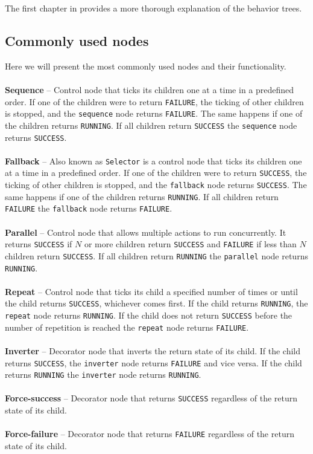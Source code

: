     \noindent The first chapter in \cite{BT_intro} provides a more thorough explanation of the behavior trees.

    \subsection{Commonly used nodes}
        Here we will present the most commonly used nodes and their functionality.\\\\
        \textbf{Sequence} -- Control node that ticks its children one at a time in a predefined order. If one of the children were to return \texttt{FAILURE}, the ticking of other children is stopped, and the \texttt{sequence} node returns \texttt{FAILURE}. The same happens if one of the children returns \texttt{RUNNING}. If all children return \texttt{SUCCESS} the \texttt{sequence} node returns \texttt{SUCCESS}.\\\\
        \textbf{Fallback} -- Also known as \texttt{Selector} is a control node that ticks its children one at a time in a predefined order. If one of the children were to return \texttt{SUCCESS}, the ticking of other children is stopped, and the \texttt{fallback} node returns \texttt{SUCCESS}. The same happens if one of the children returns \texttt{RUNNING}. If all children return \texttt{FAILURE} the \texttt{fallback} node returns \texttt{FAILURE}.\\\\
        \textbf{Parallel} -- Control node that allows multiple actions to run concurrently. It returns \texttt{SUCCESS} if $N$ or more children return \texttt{SUCCESS} and \texttt{FAILURE} if less than $N$ children return \texttt{SUCCESS}. If all children return \texttt{RUNNING} the \texttt{parallel} node returns \texttt{RUNNING}.\\\\
        \textbf{Repeat} -- Control node that ticks its child a specified number of times or until the child returns \texttt{SUCCESS}, whichever comes first. If the child returns \texttt{RUNNING}, the \texttt{repeat} node returns \texttt{RUNNING}. If the child does not return \texttt{SUCCESS} before the number of repetition is reached the \texttt{repeat} node returns \texttt{FAILURE}.\\\\
        \textbf{Inverter} -- Decorator node that inverts the return state of its child. If the child returns \texttt{SUCCESS}, the \texttt{inverter} node returns \texttt{FAILURE} and vice versa. If the child returns \texttt{RUNNING} the \texttt{inverter} node returns \texttt{RUNNING}.\\\\
        \textbf{Force-success} -- Decorator node that returns \texttt{SUCCESS} regardless of the return state of its child.\\\\
        \textbf{Force-failure} -- Decorator node that returns \texttt{FAILURE} regardless of the return state of its child.

